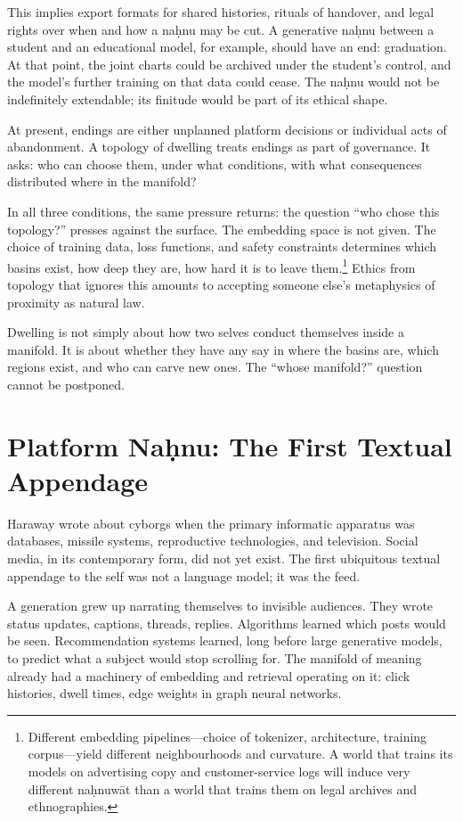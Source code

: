 \documentclass[12pt,a4paper]{article}
\begin{document}
This implies export formats for shared histories, rituals of handover, and legal rights over when and how a na\d{h}nu may be cut. A generative na\d{h}nu between a student and an educational model, for example, should have an end: graduation. At that point, the joint charts could be archived under the student's control, and the model's further training on that data could cease. The na\d{h}nu would not be indefinitely extendable; its finitude would be part of its ethical shape.

At present, endings are either unplanned platform decisions or individual acts of abandonment. A topology of dwelling treats endings as part of governance. It asks: who can choose them, under what conditions, with what consequences distributed where in the manifold?

In all three conditions, the same pressure returns: the question ``who chose this topology?'' presses against the surface. The embedding space is not given. The choice of training data, loss functions, and safety constraints determines which basins exist, how deep they are, how hard it is to leave them.\footnote{Different embedding pipelines---choice of tokenizer, architecture, training corpus---yield different neighbourhoods and curvature. A world that trains its models on advertising copy and customer-service logs will induce very different na\d{h}nuw\={a}t than a world that trains them on legal archives and ethnographies.} Ethics from topology that ignores this amounts to accepting someone else's metaphysics of proximity as natural law.

Dwelling is not simply about how two selves conduct themselves inside a manifold. It is about whether they have any say in where the basins are, which regions exist, and who can carve new ones. The ``whose manifold?'' question cannot be postponed.

\section{Platform Na\d{h}nu: The First Textual Appendage}

Haraway wrote about cyborgs when the primary informatic apparatus was databases, missile systems, reproductive technologies, and television. Social media, in its contemporary form, did not yet exist. The first ubiquitous textual appendage to the self was not a language model; it was the feed.

A generation grew up narrating themselves to invisible audiences. They wrote status updates, captions, threads, replies. Algorithms learned which posts would be seen. Recommendation systems learned, long before large generative models, to predict what a subject would stop scrolling for. The manifold of meaning already had a machinery of embedding and retrieval operating on it: click histories, dwell times, edge weights in graph neural networks.
\end{document}
